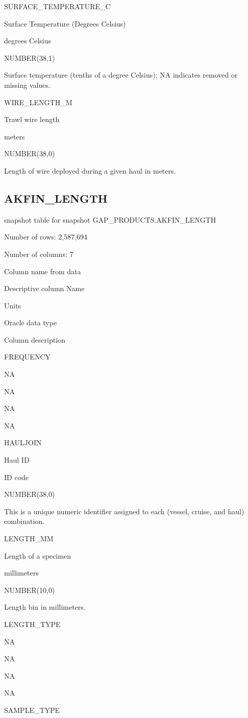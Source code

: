 \documentclass[
  letterpaper,
  oneside,
  open=any]{scrbook}
\begin{document}
SURFACE\_TEMPERATURE\_C

Surface Temperature (Degrees Celsius)

degrees Celsius

NUMBER(38,1)

Surface temperature (tenths of a degree Celsius); NA indicates removed
or missing values.

WIRE\_LENGTH\_M

Trawl wire length

meters

NUMBER(38,0)

Length of wire deployed during a given haul in meters.

\hypertarget{akfin_length}{%
\subsection{AKFIN\_LENGTH}\label{akfin_length}}

snapshot table for snapshot GAP\_PRODUCTS.AKFIN\_LENGTH

Number of rows: 2,587,694

Number of columns: 7

Column name from data

Descriptive column Name

Units

Oracle data type

Column description

FREQUENCY

NA

NA

NA

NA

HAULJOIN

Haul ID

ID code

NUMBER(38,0)

This is a unique numeric identifier assigned to each (vessel, cruise,
and haul) combination.

LENGTH\_MM

Length of a specimen

millimeters

NUMBER(10,0)

Length bin in millimeters.

LENGTH\_TYPE

NA

NA

NA

NA

SAMPLE\_TYPE
\end{document}
